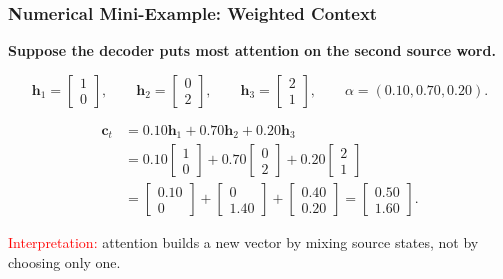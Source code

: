\documentclass[notes,11pt, aspectratio=169]{beamer}
\newcommand{\vc}{\mathbf{c}}
\newcommand{\vh}{\mathbf{h}}
\begin{document}
\begin{frame}
\frametitle{Numerical Mini-Example: Weighted Context}

\textbf{Suppose the decoder puts most attention on the second source word.}

\vspace{4pt}
\[
    \vh_1 =
    \begin{bmatrix} 1 \\ 0 \end{bmatrix},
    \qquad
    \vh_2 =
    \begin{bmatrix} 0 \\ 2 \end{bmatrix},
    \qquad
    \vh_3 =
    \begin{bmatrix} 2 \\ 1 \end{bmatrix},
    \qquad
    \alpha = (0.10, 0.70, 0.20).
\]

\vspace{2pt}
\begin{align*}
    \vc_t
    &= 0.10\vh_1 + 0.70\vh_2 + 0.20\vh_3 \\
    &= 0.10
    \begin{bmatrix} 1 \\ 0 \end{bmatrix}
    + 0.70
    \begin{bmatrix} 0 \\ 2 \end{bmatrix}
    + 0.20
    \begin{bmatrix} 2 \\ 1 \end{bmatrix} \\
    &=
    \begin{bmatrix} 0.10 \\ 0 \end{bmatrix}
    +
    \begin{bmatrix} 0 \\ 1.40 \end{bmatrix}
    +
    \begin{bmatrix} 0.40 \\ 0.20 \end{bmatrix}
    =
    \begin{bmatrix} 0.50 \\ 1.60 \end{bmatrix}.
\end{align*}

\textcolor{red}{Interpretation:} attention builds a new vector by mixing source states, not by choosing only one.
\end{frame}
\end{document}
